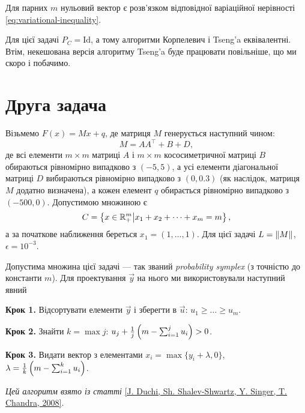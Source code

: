 Для парних $m$ нульовий вектор є розв'язком відповідної варіаційної нерівності \eqref{eq:variational-inequality}.

\begin{remark}
    Для цієї задачі $P_C = \text{Id}$, а тому алгоритми Корпелевич і Tseng'a еквівалентні. Втім, некешована версія алгоритму Tseng'a буде працювати повільніше, що ми скоро і побачимо.
\end{remark}


\section{Друга задача}

Візьмемо $F(x) = M x + q$, де матриця $M$ генерується наступний чином:
\begin{equation}
    M = A A^\intercal + B + D,
\end{equation}
де всі елементи $m \times m$ матриці $A$ і $m \times m$ кососиметричної матриці $B$ обираються рівномірно випадково з $(-5, 5)$, а усі елементи діагональної матриці $D$ вибираються рівномірно випадково з $(0, 0.3)$ (як наслідок, матриця $M$ додатно визначена), а кожен елемент $q$ обирається рівномірно випадково з $(-500, 0)$. Допустимою множиною є 
\begin{equation}
    C = \left\{ x \in \mathbb{R}_+^m \middle| x_1 + x_2 + \dots + x_m = m \right\},
\end{equation}
а за початкове наближення береться $x_1 = (1, \dots, 1)$. Для цієї задачі $L = \left\| M \right\|$, $\epsilon = 10^{-3}$. \medskip

Допустима множина цієї задачі --- так званий \emph{probability symplex} (з точністю до константи $m$). Для проектування $\vec y$ на нього ми використовували наступний явний
\begin{algorithm}\nothing

    \textbf{Крок 1.} Відсортувати елементи $\vec y$ і зберегти в $\vec u$: $u_1 \ge \dots \ge u_m$. \medskip
        
    \textbf{Крок 2.} Знайти $k = \max j$: $u_j + \frac{1}{j} \left( m - \operatorname*{\sum}_{i = 1}^j u_i \right) > 0$. \medskip
        
    \textbf{Крок 3.} Видати вектор з елементами $x_i = \max\{y_i + \lambda, 0\}$, $\lambda = \frac{1}{k} \left( m - \operatorname*{\sum}_{i = 1}^k u_i \right)$.
\end{algorithm}

\emph{Цей алгоритм взято із статті} \href{https://stanford.edu/~jduchi/projects/DuchiShSiCh08.pdf}{[J. Duchi, Sh. Shalev-Shwartz, Y. Singer, T. Chandra, 2008]}.


